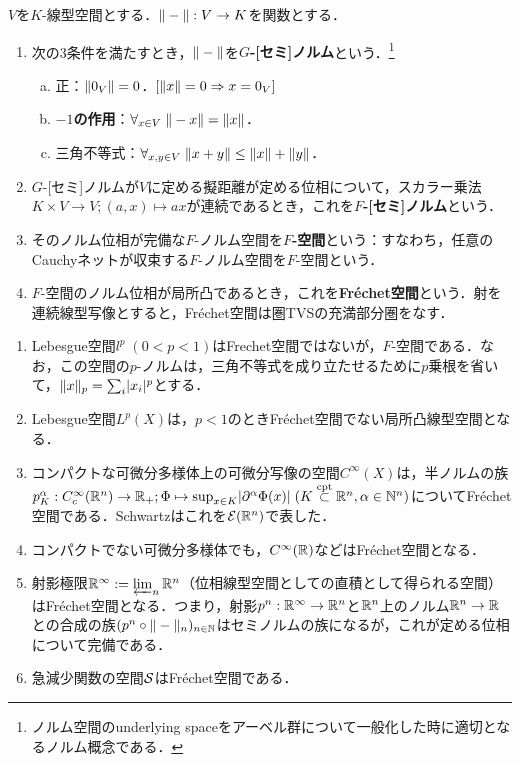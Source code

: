 \documentclass[uplatex,dvipdfmx]{jsreport}
\begin{document}
\begin{definition}
    $V$を$K$-線型空間とする．$\|-\|:V\to K$を関数とする．
    \begin{enumerate}
        \item 次の3条件を満たすとき，$\|-\|$を\textbf{$G$-[セミ]ノルム}という．\footnote{ノルム空間のunderlying spaceをアーベル群について一般化した時に適切となるノルム概念である．}
        \begin{enumerate}[(a)]
            \item 正：$\|0_V\|=0$．$[\|x\|=0\Rightarrow x=0_V]$
            \item \textbf{$-1$の作用}：$\forall_{x\in V}\;\|-x\|=\|x\|$．
            \item 三角不等式：$\forall_{x,y\in V}\;\|x+y\|\le\|x\|+\|y\|$．
        \end{enumerate}
        \item $G$-[セミ]ノルムが$V$に定める擬距離が定める位相について，スカラー乗法$K\times V\to V;(a,x)\mapsto ax$が連続であるとき，これを\textbf{$F$-[セミ]ノルム}という．
        \item そのノルム位相が完備な$F$-ノルム空間を\textbf{$F$-空間}という：すなわち，任意のCauchyネットが収束する$F$-ノルム空間を$F$-空間という．
        \item $F$-空間のノルム位相が局所凸であるとき，これを\textbf{Fréchet空間}という．射を連続線型写像とすると，Fréchet空間は圏TVSの充満部分圏をなす．
    \end{enumerate}
\end{definition}

\begin{example}[Frechet空間]\mbox{}
    \begin{enumerate}
        \item Lebesgue空間$l^p\;(0<p<1)$はFrechet空間ではないが，$F$-空間である．なお，この空間の$p$-ノルムは，三角不等式を成り立たせるために$p$乗根を省いて，$\|x\|_p=\sum_{i}\lvert x_i\rvert^p$とする．
        \item Lebesgue空間$L^p(X)$は，$p<1$のときFréchet空間でない局所凸線型空間となる．
        \item コンパクトな可微分多様体上の可微分写像の空間$C^\infty(X)$は，半ノルムの族$p^\alpha_K:C_c^\infty(\mathbb{R}^n)\to\mathbb{R}_+;\Phi\mapsto\sup_{x\in K}\lvert\partial^\alpha\Phi(x)\rvert\;(K\overset{\textrm{cpt}}{\subset}\mathbb{R}^n,\alpha\in\mathbb{N}^n)$についてFréchet空間である．Schwartzはこれを$\mathcal{E}(\mathbb{R}^n)$で表した．
        \item コンパクトでない可微分多様体でも，$C^\infty(\mathbb{R})$などはFréchet空間となる．
        \item 射影極限$\mathbb{R}^\infty:=\varprojlim_n\mathbb{R}^n$（位相線型空間としての直積として得られる空間）はFréchet空間となる．つまり，射影$p^n:\mathbb{R}^\infty\to\mathbb{R}^n$と$\mathbb{R}^n$上のノルム$\mathbb{R}^n\to\mathbb{R}$との合成の族$(p^n\circ\|-\|_n)_{n\in\mathbb{N}}$はセミノルムの族になるが，これが定める位相について完備である．
        \item 急減少関数の空間$\mathcal{S}$はFréchet空間である．
    \end{enumerate}
\end{example}
\end{document}
